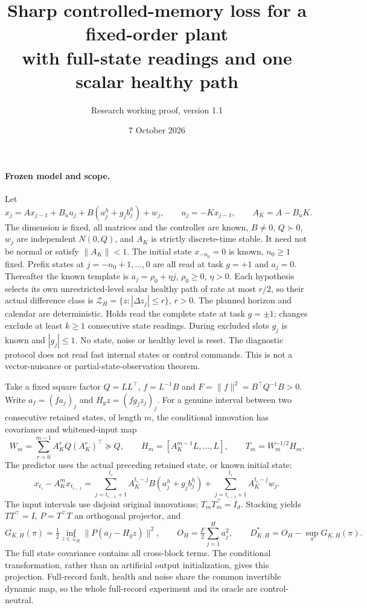 \documentclass[11pt]{article}
\title{Sharp controlled-memory loss for a fixed-order plant\\with full-state readings and one scalar healthy path}
\author{Research working proof, version 1.1}
\date{7 October 2026}
\begin{document}
\maketitle

\paragraph{Frozen model and scope.}
Let
\[
x_j=A x_{j-1}+B_u u_j+B(a_j^h+g_j b_j^h)+w_j,\qquad
u_j=-Kx_{j-1},\qquad A_K=A-B_uK .
\]
The dimension is fixed, all matrices and the controller are known,
$B\ne0$, $Q\succ0$, $w_j$ are independent $N(0,Q)$, and $A_K$ is strictly
discrete-time stable. It need not be normal or satisfy $\|A_K\|<1$.
The initial state $x_{-n_0}=0$ is known, $n_0\ge1$ fixed.
Prefix states at $j=-n_0+1,\ldots,0$ are all read at task $g=+1$ and
$a_j=0$. Thereafter the known template is $a_j=\rho_0+\eta j$,
$\rho_0\ge0$, $\eta>0$. Each hypothesis selects its own unrestricted-level
scalar healthy path of rate at most $r/2$, so their actual difference class
is $\mathcal Z_H=\{z:|\Delta z_j|\le r\}$, $r>0$.
The planned horizon and calendar are deterministic. Holds read the complete
state at task $g=\pm1$; changes exclude at least $k\ge1$ consecutive state
readings. During excluded slots $g_j$ is known and $|g_j|\le1$.
No state, noise or healthy level is reset.
The diagnostic protocol does not read fast internal states or control commands.
This is not a vector-nuisance or partial-state-observation theorem.

Take a fixed square factor $Q=LL^\top$, $f=L^{-1}B$ and
$F=\|f\|^2=B^\top Q^{-1}B>0$.
Write $a_f=(f a_j)_j$ and $H_gz=(f g_j z_j)_j$.
For a genuine interval between two consecutive retained states, of length $m$,
the conditional innovation has covariance and whitened-input map
\[
W_m=\sum_{r=0}^{m-1}A_K^rQ(A_K^r)^\top\succeq Q,\qquad
H_m=[A_K^{m-1}L,\ldots,L],\qquad T_m=W_m^{-1/2}H_m .
\]
The predictor uses the actual preceding retained state, or known initial state:
\[
x_{t_i}-A_K^m x_{t_{i-1}}
=\sum_{j=t_{i-1}+1}^{t_i}A_K^{t_i-j}B(a_j^h+g_jb_j^h)
+\sum_{j=t_{i-1}+1}^{t_i}A_K^{t_i-j}w_j .
\]
The input intervals use disjoint original innovations; $T_mT_m^\top=I_d$.
Stacking yields $TT^\top=I$, $P=T^\top T$ an orthogonal projector, and
\[
G_{K,H}(\pi)=\tfrac12\inf_{z\in\mathcal Z_H}\|P(a_f-H_gz)\|^2,\qquad
O_H=\tfrac F2\sum_{j=1}^H a_j^2,\qquad
D_{K,H}^*=O_H-\sup_\pi G_{K,H}(\pi).
\]
The full state covariance contains all cross-block terms. The conditional
transformation, rather than an artificial output initialization, gives this
projection. Full-record fault, health and noise share the common invertible
dynamic map, so the whole full-record experiment and its oracle are
control-neutral.
\end{document}
